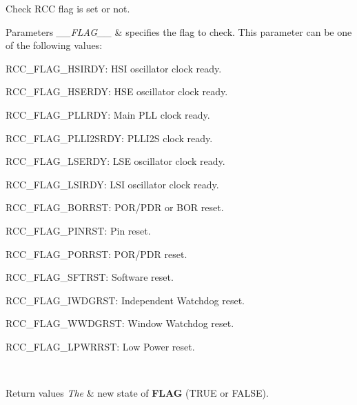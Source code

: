 Check R\+CC flag is set or not. 


\begin{DoxyParams}{Parameters}
{\em \+\_\+\+\_\+\+F\+L\+A\+G\+\_\+\+\_\+} & specifies the flag to check. This parameter can be one of the following values\+: \begin{DoxyItemize}
\item R\+C\+C\+\_\+\+F\+L\+A\+G\+\_\+\+H\+S\+I\+R\+DY\+: H\+SI oscillator clock ready. \item R\+C\+C\+\_\+\+F\+L\+A\+G\+\_\+\+H\+S\+E\+R\+DY\+: H\+SE oscillator clock ready. \item R\+C\+C\+\_\+\+F\+L\+A\+G\+\_\+\+P\+L\+L\+R\+DY\+: Main P\+LL clock ready. \item R\+C\+C\+\_\+\+F\+L\+A\+G\+\_\+\+P\+L\+L\+I2\+S\+R\+DY\+: P\+L\+L\+I2S clock ready. \item R\+C\+C\+\_\+\+F\+L\+A\+G\+\_\+\+L\+S\+E\+R\+DY\+: L\+SE oscillator clock ready. \item R\+C\+C\+\_\+\+F\+L\+A\+G\+\_\+\+L\+S\+I\+R\+DY\+: L\+SI oscillator clock ready. \item R\+C\+C\+\_\+\+F\+L\+A\+G\+\_\+\+B\+O\+R\+R\+ST\+: P\+O\+R/\+P\+DR or B\+OR reset. \item R\+C\+C\+\_\+\+F\+L\+A\+G\+\_\+\+P\+I\+N\+R\+ST\+: Pin reset. \item R\+C\+C\+\_\+\+F\+L\+A\+G\+\_\+\+P\+O\+R\+R\+ST\+: P\+O\+R/\+P\+DR reset. \item R\+C\+C\+\_\+\+F\+L\+A\+G\+\_\+\+S\+F\+T\+R\+ST\+: Software reset. \item R\+C\+C\+\_\+\+F\+L\+A\+G\+\_\+\+I\+W\+D\+G\+R\+ST\+: Independent Watchdog reset. \item R\+C\+C\+\_\+\+F\+L\+A\+G\+\_\+\+W\+W\+D\+G\+R\+ST\+: Window Watchdog reset. \item R\+C\+C\+\_\+\+F\+L\+A\+G\+\_\+\+L\+P\+W\+R\+R\+ST\+: Low Power reset. \end{DoxyItemize}
\\
\hline
\end{DoxyParams}

\begin{DoxyRetVals}{Return values}
{\em The} & new state of {\bfseries F\+L\+AG} (T\+R\+UE or F\+A\+L\+SE). \\
\hline
\end{DoxyRetVals}

